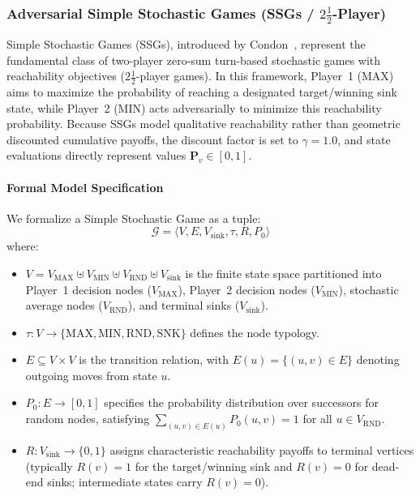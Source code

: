 \documentclass{article}
\begin{document}
\subsubsection{Adversarial Simple Stochastic Games (SSGs / $2\frac{1}{2}$-Player)}\label{sec:ssgs}

Simple Stochastic Games (SSGs), introduced by Condon~\cite{Condon:1992:complexity}, represent the fundamental class of two-player zero-sum turn-based stochastic games with reachability objectives ($2\frac{1}{2}$-player games). In this framework, Player~1 ($\text{MAX}$) aims to maximize the probability of reaching a designated target/winning sink state, while Player~2 ($\text{MIN}$) acts adversarially to minimize this reachability probability. Because SSGs model qualitative reachability rather than geometric discounted cumulative payoffs, the discount factor is set to $\gamma = 1.0$, and state evaluations directly represent values $\mathbf{P}_v \in [0, 1]$.

\paragraph{Formal Model Specification}
We formalize a Simple Stochastic Game as a tuple:
\begin{equation}
\mathcal{G} = \langle V, E, V_{\text{sink}}, \tau, R, P_0 \rangle
\end{equation}
where:
\begin{itemize}
    \item $V = V_{\text{MAX}} \uplus V_{\text{MIN}} \uplus V_{\text{RND}} \uplus V_{\text{sink}}$ is the finite state space partitioned into Player~1 decision nodes ($V_{\text{MAX}}$), Player~2 decision nodes ($V_{\text{MIN}}$), stochastic average nodes ($V_{\text{RND}}$), and terminal sinks ($V_{\text{sink}}$).
    \item $\tau : V \to \{\text{MAX}, \text{MIN}, \text{RND}, \text{SNK}\}$ defines the node typology.
    \item $E \subseteq V \times V$ is the transition relation, with $E(u) = \{(u, v) \in E\}$ denoting outgoing moves from state $u$.
    \item $P_0 : E \to [0, 1]$ specifies the probability distribution over successors for random nodes, satisfying $\sum_{(u, v) \in E(u)} P_0(u, v) = 1$ for all $u \in V_{\text{RND}}$.
    \item $R : V_{\text{sink}} \to \{0, 1\}$ assigns characteristic reachability payoffs to terminal vertices (typically $R(v) = 1$ for the target/winning sink and $R(v) = 0$ for dead-end sinks; intermediate states carry $R(v) = 0$).
\end{itemize}
\end{document}

